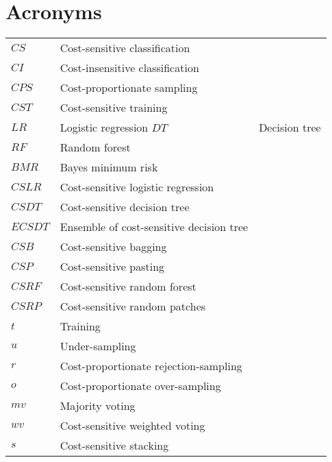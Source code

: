
\chapter{Acronyms}

\begin{tabularx}{\textwidth}{ l X }
$CS$ 		& Cost-sensitive classification \\
$CI$    & Cost-insensitive classification \\ 
$CPS$    & Cost-proportionate sampling \\
$CST$    & Cost-sensitive training \\ 
$LR$  & Logistic regression 
$DT$  & Decision tree  \\
$RF$ &  Random forest  \\
$BMR$ & Bayes minimum risk \\
$CSLR$ & Cost-sensitive logistic regression  \\
$CSDT$ & Cost-sensitive decision tree  \\
$ECSDT$ & Ensemble of cost-sensitive decision tree \\
$CSB$ & Cost-sensitive bagging\\
$CSP$ & Cost-sensitive pasting\\
$CSRF$ & Cost-sensitive random forest  \\
$CSRP$ & Cost-sensitive random patches  \\
$t$ & Training \\
$u$ & Under-sampling \\
$r$ & Cost-proportionate rejection-sampling \\
$o$ & Cost-proportionate over-sampling \\
$mv$ & Majority voting \\
$wv$ & Cost-sensitive weighted voting \\
$s$ & Cost-sensitive stacking \\
\end{tabularx}

